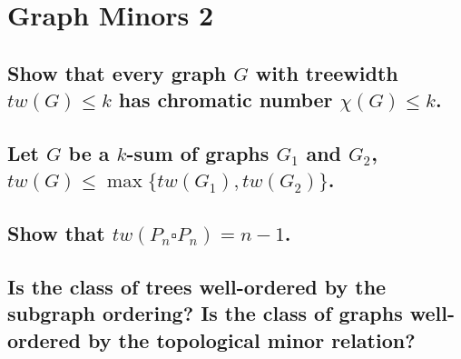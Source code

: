 \section{Graph Minors 2}

\subsection[Minors 2 - 1]{Show that every graph $G$ with treewidth $tw(G) \leq k$ has chromatic number $\chi(G) \leq k$.}

\subsection[Minors 2 - 3]{Let $G$ be a $k$-sum of graphs $G_1$ and $G_2$, $tw(G) \leq \max\{tw(G_1), tw(G_2)\}$.}

\subsection[Minors 2 - 5]{Show that $tw(P_n \square P_n) = n-1$.}

\subsection[Minors 2 - 7]{Is the class of trees well-ordered by the subgraph ordering? Is the class of graphs well-ordered by the topological minor relation?}
